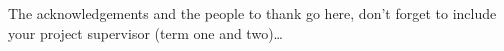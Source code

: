 The acknowledgements and the people to thank go here, don't forget to include your project supervisor (term one and two)\ldots